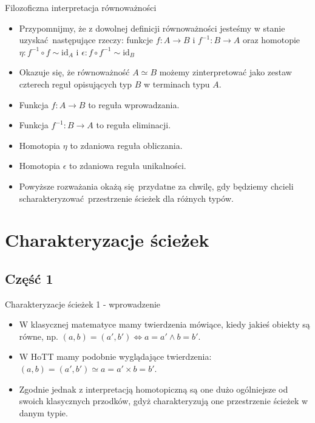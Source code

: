 \documentclass{beamer}
\newcommand{\id}{\text{id}}
\newcommand{\comp}{\circ}
\newcommand{\finv}[1]{#1^{-1}}
\newcommand{\inv}[1]{#1^{-1}}
\begin{document}
\begin{frame}{Filozoficzna interpretacja równoważności}
\begin{itemize}
	\item Przypomnijmy, że z dowolnej definicji równoważności jesteśmy w stanie uzyskać następujące rzeczy: funkcje $f : A \to B$ i $\inv{f} : B \to A$ oraz homotopie $\eta : \inv{f} \comp f \sim \id_A$ i $\epsilon : f \comp \inv{f} \sim \id_B$
	\item Okazuje się, że równoważność $A \simeq B$ możemy zinterpretować jako zestaw czterech reguł opisujących typ $B$ w terminach typu $A$.
	\item Funkcja $f : A \to B$ to reguła wprowadzania.
	\item Funkcja $\finv{f} : B \to A$ to reguła eliminacji.
	\item Homotopia $\eta$ to zdaniowa reguła obliczania.
	\item Homotopia $\epsilon$ to zdaniowa reguła unikalności.
	\item Powyższe rozważania okażą się przydatne za chwilę, gdy będziemy chcieli scharakteryzować przestrzenie ścieżek dla różnych typów.
\end{itemize}
\end{frame}

\section{Charakteryzacje ścieżek}

\subsection{Część 1}

\begin{frame}{Charakteryzacje ścieżek 1 - wprowadzenie}
\begin{itemize}
	\item W klasycznej matematyce mamy twierdzenia mówiące, kiedy jakieś obiekty są równe, np. $(a, b) = (a', b') \iff a = a' \land b = b'$.
	\item W HoTT mamy podobnie wyglądające twierdzenia: $(a, b) = (a', b') \simeq a = a' \times b = b'$.
	\item Zgodnie jednak z interpretacją homotopiczną są one dużo ogólniejsze od swoich klasycznych przodków, gdyż charakteryzują one przestrzenie ścieżek w danym typie.
\end{itemize}
\end{frame}
\end{document}
